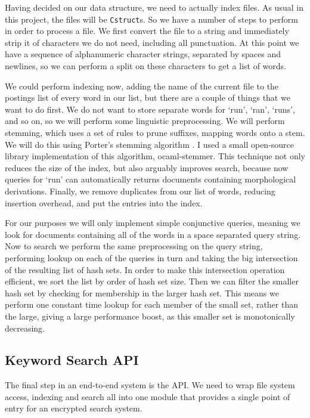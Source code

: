 \documentclass[12pt,a4paper,twoside,openright]{report}
\begin{document}
Having decided on our data structure, we need to actually index files. As usual in this project, the files will be \texttt{Cstruct}s. So we have a number of steps to perform in order to process a file. We first convert the file to a string and immediately strip it of characters we do not need, including all punctuation. At this point we have a sequence of alphanumeric character strings, separated by spaces and newlines, so we can perform a split on these characters to get a list of words.

We could perform indexing now, adding the name of the current file to the postings list of every word in our list, but there are a couple of things that we want to do first. We do not want to store separate words for `run', `ran', `runs', and so on, so we will perform some linguistic preprocessing. We will perform stemming, which uses a set of rules to prune suffixes, mapping words onto a stem. We will do this using Porter's stemming algorithm \cite{porter1980algorithm}. I used a small open-source library implementation of this algorithm, ocaml-stemmer. This technique not only reduces the size of the index, but also arguably improves search, because now queries for `run' can automatically returns documents containing morphological derivations. Finally, we remove duplicates from our list of words, reducing insertion overhead, and put the entries into the index.

For our purposes we will only implement simple conjunctive queries, meaning we look for documents containing all of the words in a space separated query string. Now to search we perform the same preprocessing on the query string, performing lookup on each of the queries in turn and taking the big intersection of the resulting list of hash sets. In order to make this intersection operation efficient, we sort the list by order of hash set size. Then we can filter the smaller hash set by checking for membership in the larger hash set. This means we perform one constant time lookup for each member of the small set, rather than the large, giving a large performance boost, as this smaller set is monotonically decreasing.

\subsection{Keyword Search API}
\label{subsec:searchapi}

The final step in an end-to-end system is the API. We need to wrap file system access, indexing and search all into one module that provides a single point of entry for an encrypted search system.
\end{document}
